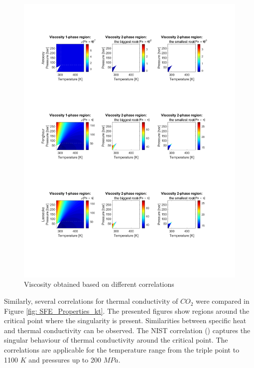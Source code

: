 \documentclass[../Article_Model_Parameters.tex]{subfiles}
\begin{document}
\begin{figure}[!h]
		\includegraphics[trim = 1.5cm 4.0cm  14cm 19.0cm,clip,width=\columnwidth]{Figures/MU.pdf}	
		\caption{Viscosity obtained based on different correlations } 
		\label{fig: SFE_Properties_mu}
	\end{figure} 
	
	Similarly, several correlations for thermal conductivity of $CO_2$ were compared in Figure \ref{fig: SFE_Properties_kt}. The presented figures show regions around the critical point where the singularity is present. Similarities between specific heat and thermal conductivity can be observed. The NIST correlation (\citet{Huber2016}) captures the singular behaviour of thermal conductivity around the critical point. The correlations are applicable for the temperature range from the triple point to 1100 $K$ and pressures up to 200 $MPa$. 
	
\end{document}
